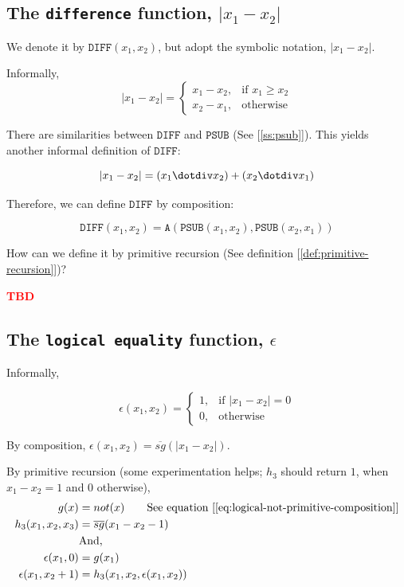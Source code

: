 \documentclass[11pt]{book}
\theoremstyle{definition}
\theoremstyle{plain}
\theoremstyle{problemstyle}
\theoremstyle{remark}
\theoremstyle{definition}
\newcommand{\tbd}{
    \vspace{5mm}
    \textbf{\textcolor{red}{\Large{TBD}}}
    \vspace{5mm}
}
\begin{document}
\subsection*{The \texttt{difference} function, $\lvert x_1-x_2\rvert$}
We denote it by $\texttt{DIFF}(x_1,x_2)$, but adopt the symbolic notation, $\lvert x_1-x_2\rvert$.

Informally,
    \[ 
    \left\lvert x_1-x_2\right\rvert=
        \begin{cases}
			x_1-x_2, & \text{if $x_1\geq x_2$}\\
            x_2-x_1, & \text{otherwise}
		 \end{cases}
    \]

There are similarities between $\texttt{DIFF}$ and $\texttt{PSUB}$ (See [\ref{ss:psub}]). This yields another informal definition of $\texttt{DIFF}$:

    \[ 
        \left\lvert x_1-x_2\right\rvert=(x_1\dotdiv x_2)+(x_2\dotdiv x_1)
    \]

    Therefore, we can define $\texttt{DIFF}$ by composition:

    \[ 
        \texttt{DIFF}(x_1,x_2)=\texttt{A}(\texttt{PSUB}(x_1,x_2),\texttt{PSUB}(x_2,x_1))
    \]

    How can we define it by primitive recursion (See definition [\ref{def:primitive-recursion}])?
 
    \tbd

\subsection*{The \texttt{logical equality} function, $\epsilon$}
Informally,

    \[ 
    \epsilon(x_1,x_2)=
        \begin{cases}
			1, & \text{if $\lvert x_1-x_2\rvert=0$}\\
            0, & \text{otherwise}
		 \end{cases}
    \]

By composition, $\epsilon(x_1,x_2)=\overline{sg}(\lvert x_1-x_2\rvert)$.

By primitive recursion (some experimentation helps; $h_3$ should return $1$, when $x_1-x_2=1$ and $0$ otherwise),
            \begin{equation}
                \label{eq:logical-equality}
                \begin{aligned}
                    g(x)&=not(x)\quad\quad\text{See equation [\ref{eq:logical-not-primitive-composition}]}\\
                    h_3(x_1,x_2,x_3)&=\overline{sg}(x_1-x_2-1) \\
                    &\text{And,}\\
                    \epsilon(x_1,0)&=g(x_1)\\
                    \epsilon(x_1,x_2+1)&=h_3(x_1,x_2,\epsilon(x_1,x_2))
                \end{aligned}
            \end{equation}
\end{document}
